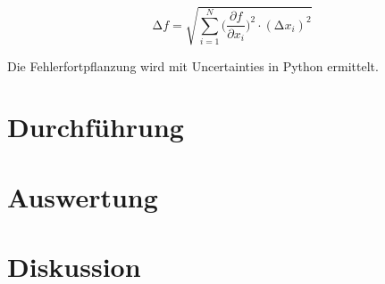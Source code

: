 \begin{equation}
    \increment{f} = \sqrt{ \sum_{i = 1}^{N}  \biggl(\frac{\partial{f}}{\partial{x_i}}\biggr)^2\cdot(\increment{x_i})^2}
    \label{eqn:Gauss}
\end{equation}

Die Fehlerfortpflanzung wird mit Uncertainties in Python \cite{uncertainties} ermittelt.


\section{Durchführung}



\section{Auswertung}



\section{Diskussion}


\newpage
\printbibliography

